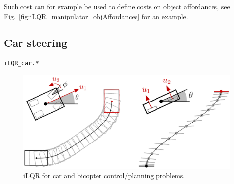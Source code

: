 \documentclass[10pt,a4paper]{article} %
\newcommand{\filename}[1]{\colorbox{rr2}{\color{white}\texttt{#1}}}
\begin{document}
Such cost can for example be used to define costs on object affordances, see Fig.~\ref{fig:iLQR_manipulator_objAffordances} for an example.


\subsection{Car steering}
\begin{flushright}
\filename{iLQR\_car.*}
\end{flushright}

\begin{figure}
\centering
\includegraphics[width=.6\columnwidth]{images/car-bicopter01.jpg}
\caption{\footnotesize
iLQR for car and bicopter control/planning problems.
}
\label{fig:iLQR_car_bicopter}
\end{figure}
\end{document}
